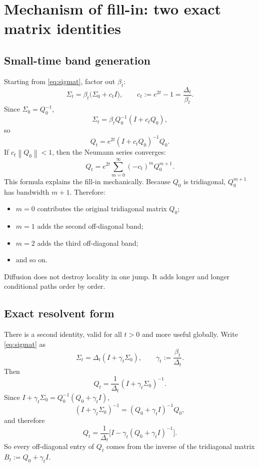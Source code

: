 \documentclass[11pt]{article}
\newcommand{\Id}{I}
\newcommand{\norm}[1]{\left\lVert #1 \right\rVert}
\begin{document}
\section{Mechanism of fill-in: two exact matrix identities}
\subsection{Small-time band generation}
Starting from \eqref{eq:sigmat}, factor out $\beta_t$:
\[
\Sigma_t=\beta_t\big(\Sigma_0+c_t\Id\big),
\qquad
c_t:=e^{2t}-1=\frac{\Delta_t}{\beta_t}.
\]
Since $\Sigma_0=Q_0^{-1}$,
\[
\Sigma_t=\beta_t Q_0^{-1}(\Id+c_tQ_0),
\]
so
\begin{equation}\label{eq:qt_neumann_identity}
Q_t=e^{2t}(\Id+c_tQ_0)^{-1}Q_0.
\end{equation}
If $c_t\norm{Q_0}<1$, then the Neumann series converges:
\begin{equation}\label{eq:qt_neumann}
Q_t=e^{2t}\sum_{m=0}^{\infty}(-c_t)^mQ_0^{m+1}.
\end{equation}
This formula explains the fill-in mechanically. Because $Q_0$ is tridiagonal, $Q_0^{m+1}$ has bandwidth $m+1$. Therefore:
\begin{itemize}[leftmargin=1.5em]
\item $m=0$ contributes the original tridiagonal matrix $Q_0$;
\item $m=1$ adds the second off-diagonal band;
\item $m=2$ adds the third off-diagonal band;
\item and so on.
\end{itemize}
Diffusion does not destroy locality in one jump. It adds longer and longer conditional paths order by order.

\subsection{Exact resolvent form}
There is a second identity, valid for all $t>0$ and more useful globally. Write \eqref{eq:sigmat} as
\[
\Sigma_t=\Delta_t(\Id+\gamma_t\Sigma_0),
\qquad
\gamma_t:=\frac{\beta_t}{\Delta_t}.
\]
Then
\begin{equation}\label{eq:qt_gamma}
Q_t=\frac{1}{\Delta_t}(\Id+\gamma_t\Sigma_0)^{-1}.
\end{equation}
Since $\Id+\gamma_t\Sigma_0=Q_0^{-1}(Q_0+\gamma_t\Id)$,
\[
(\Id+\gamma_t\Sigma_0)^{-1}=(Q_0+\gamma_t\Id)^{-1}Q_0,
\]
and therefore
\begin{equation}\label{eq:qt_resolvent}
Q_t=\frac{1}{\Delta_t}\Big[\Id-\gamma_t(Q_0+\gamma_t\Id)^{-1}\Big].
\end{equation}
So every off-diagonal entry of $Q_t$ comes from the inverse of the tridiagonal matrix $B_t:=Q_0+\gamma_t\Id$.
\end{document}
